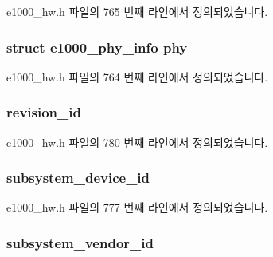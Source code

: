 e1000\+\_\+hw.\+h 파일의 765 번째 라인에서 정의되었습니다.

\subsubsection[{\texorpdfstring{phy}{phy}}]{\setlength{\rightskip}{0pt plus 5cm}struct {\bf e1000\+\_\+phy\+\_\+info} phy}\hypertarget{structe1000__hw_af1b2af2997be0540f732840feb2631c7}{}\label{structe1000__hw_af1b2af2997be0540f732840feb2631c7}


e1000\+\_\+hw.\+h 파일의 764 번째 라인에서 정의되었습니다.

\subsubsection[{\texorpdfstring{revision\+\_\+id}{revision_id}}]{ revision\+\_\+id}\hypertarget{structe1000__hw_a32f1ac5d313951f7044fdf5bb63ee596}{}\label{structe1000__hw_a32f1ac5d313951f7044fdf5bb63ee596}


e1000\+\_\+hw.\+h 파일의 780 번째 라인에서 정의되었습니다.

\subsubsection[{\texorpdfstring{subsystem\+\_\+device\+\_\+id}{subsystem_device_id}}]{ subsystem\+\_\+device\+\_\+id}\hypertarget{structe1000__hw_ad22f037dfd3918464c6a5baadb0775d1}{}\label{structe1000__hw_ad22f037dfd3918464c6a5baadb0775d1}


e1000\+\_\+hw.\+h 파일의 777 번째 라인에서 정의되었습니다.

\subsubsection[{\texorpdfstring{subsystem\+\_\+vendor\+\_\+id}{subsystem_vendor_id}}]{ subsystem\+\_\+vendor\+\_\+id}\hypertarget{structe1000__hw_a68f96c77fc612053fdb728712c4e7591}{}\label{structe1000__hw_a68f96c77fc612053fdb728712c4e7591}


